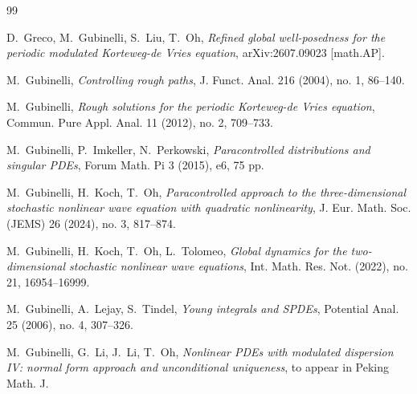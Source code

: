 \documentclass[letterpaper, 11pt,  reqno]{amsart}
\newcommand{\1}{\hspace{0.5mm}\text{I}\hspace{0.5mm}}
\numberwithin{equation}{section}
\numberwithin{theorem}{section}
\begin{document}
\begin{thebibliography}{99}



D.~Greco, M.~Gubinelli, S.~Liu, T.~Oh, 
{\it  Refined global well-posedness for the periodic modulated Korteweg-de Vries equation}, 
arXiv:2607.09023 [math.AP].

M.~Gubinelli,
{\it Controlling rough paths},
J. Funct. Anal. 216 (2004), no. 1, 86--140.



M.~Gubinelli, 
{\it Rough solutions for the periodic Korteweg-de Vries equation},
Commun. Pure Appl. Anal. 11 (2012), no. 2, 709--733.





M.~Gubinelli, P.~Imkeller, N.~Perkowski,
{\it Paracontrolled distributions and singular PDEs},
Forum Math. Pi 3 (2015), e6, 75 pp.

%
%
%

M.~Gubinelli, H.~Koch, T.~Oh, 
{\it  Paracontrolled approach to the three-dimensional stochastic nonlinear wave equation with quadratic nonlinearity},  
J. Eur. Math. Soc. (JEMS) 26 (2024), no. 3, 817--874. 

%
%
%

M.~Gubinelli, H.~Koch, T.~Oh, L.~Tolomeo,
{\it  Global dynamics for the two-dimensional stochastic nonlinear wave equations},
 Int. Math. Res. Not. (2022), no. 21, 16954--16999. 


M.~Gubinelli, A.~Lejay, S.~Tindel,
{\it Young integrals and SPDEs},
Potential Anal. 25 (2006), no. 4, 307--326.


M.~Gubinelli, G.~Li, J.~Li, T.~Oh, 
{\it Nonlinear PDEs with modulated dispersion IV: 
normal form approach and unconditional uniqueness}, 
to appear in Peking Math. J.


%



\end{thebibliography}
\end{document}
